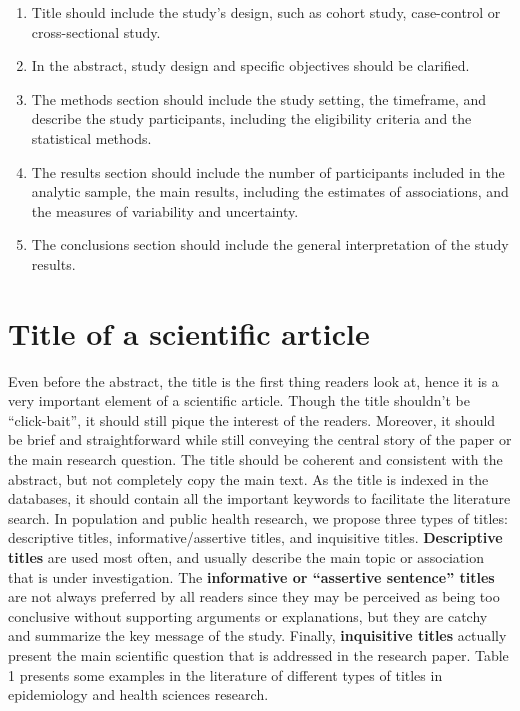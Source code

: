\documentclass[
]{book}
\providecommand{\tightlist}{%
  \setlength{\itemsep}{0pt}\setlength{\parskip}{0pt}}
\begin{document}
\begin{enumerate}
  \begin{enumerate}
  \def\labelenumii{\alph{enumii}.}
  \tightlist
  \item
    Title should include the study's design, such as cohort study, case-control or cross-sectional study.
  \item
    In the abstract, study design and specific objectives should be clarified.
  \item
    The methods section should include the study setting, the timeframe, and describe the study participants, including the eligibility criteria and the statistical methods.
  \item
    The results section should include the number of participants included in the analytic sample, the main results, including the estimates of associations, and the measures of variability and uncertainty.
  \item
    The conclusions section should include the general interpretation of the study results.
  \end{enumerate}
\end{enumerate}

\hypertarget{title-of-a-scientific-article}{%
\section{Title of a scientific article}\label{title-of-a-scientific-article}}

Even before the abstract, the title is the first thing readers look at, hence it is a very important element of a scientific article. Though the title shouldn't be ``click-bait'', it should still pique the interest of the readers. Moreover, it should be brief and straightforward while still conveying the central story of the paper or the main research question. The title should be coherent and consistent with the abstract, but not completely copy the main text. As the title is indexed in the databases, it should contain all the important keywords to facilitate the literature search. In population and public health research, we propose three types of titles: descriptive titles, informative/assertive titles, and inquisitive titles. \textbf{Descriptive titles} are used most often, and usually describe the main topic or association that is under investigation. The \textbf{informative or ``assertive sentence'' titles} \citep[p.79--83]{heard2016scientist} are not always preferred by all readers since they may be perceived as being too conclusive without supporting arguments or explanations, but they are catchy and summarize the key message of the study. Finally, \textbf{inquisitive titles} actually present the main scientific question that is addressed in the research paper. Table 1 presents some examples in the literature of different types of titles in epidemiology and health sciences research.
\end{document}
